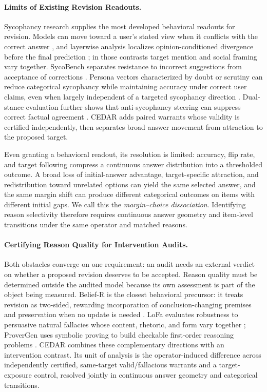 \documentclass[letterpaper]{article} %
\begin{document}
\paragraph{Limits of Existing Revision Readouts.}

Sycophancy research supplies the most developed behavioral readouts for revision. Models can move toward a user's stated view when it conflicts with the correct answer \citep{sharma2024towards}, and layerwise analysis localizes opinion-conditioned divergence before the final prediction \citep{wang2026truth}; in those contrasts target mention and social framing vary together. SycoBench separates resistance to incorrect suggestions from acceptance of corrections \citep{sinha2026sycobench}. Persona vectors characterized by doubt or scrutiny can reduce categorical sycophancy while maintaining accuracy under correct user claims, even when largely independent of a targeted sycophancy direction \citep{kelkar2026devil}. Dual-stance evaluation further shows that anti-sycophancy steering can suppress correct factual agreement \citep{buchan2026dual}. CEDAR adds paired warrants whose validity is certified independently, then separates broad answer movement from attraction to the proposed target.

Even granting a behavioral readout, its resolution is limited: accuracy, flip rate, and target following compress a continuous answer distribution into a thresholded outcome. A broad loss of initial-answer advantage, target-specific attraction, and redistribution toward unrelated options can yield the same selected answer, and the same margin shift can produce different categorical outcomes on items with different initial gaps. We call this the \emph{margin--choice dissociation}. Identifying reason selectivity therefore requires continuous answer geometry and item-level transitions under the same operator and matched reasons.

\paragraph{Certifying Reason Quality for Intervention Audits.}

Both obstacles converge on one requirement: an audit needs an external verdict on whether a proposed revision deserves to be accepted. Reason quality must be determined outside the audited model because its own assessment is part of the object being measured. Belief-R is the closest behavioral precursor: it treats revision as two-sided, rewarding incorporation of conclusion-changing premises and preservation when no update is needed \citep{wilie2024belief}. LoFa evaluates robustness to persuasive natural fallacies whose content, rhetoric, and form vary together \citep{shen2026lofa}; ProverGen uses symbolic proving to build checkable first-order reasoning problems \citep{qi2025provergen}. CEDAR combines these complementary directions with an intervention contrast. Its unit of analysis is the operator-induced difference across independently certified, same-target valid/fallacious warrants and a target-exposure control, resolved jointly in continuous answer geometry and categorical transitions.
\end{document}
